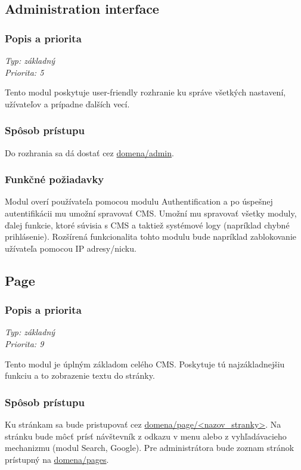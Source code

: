 \documentclass[a4paper,titlepage,11pt]{article}
\begin{document}
\subsection{Administration interface}
\subsubsection{Popis a priorita}
\begin{flushleft}
 \emph{Typ: základný}\\
 \emph{Priorita: 5}\\
\end{flushleft}
Tento modul poskytuje user-friendly rozhranie ku správe všetkých nastavení, užívateľov a prípadne ďalších vecí. 
\subsubsection{Spôsob prístupu}
Do rozhrania sa dá dostať cez \url{domena/admin}.
\subsubsection{Funkčné požiadavky}
Modul overí používateľa pomocou modulu Authentification a po úspešnej autentifikácii mu umožní spravovať CMS.
Umožní mu spravovať všetky moduly, ďalej funkcie, ktoré súvisia s CMS a taktiež systémové logy (napríklad chybné prihlásenie). Rozšírená funkcionalita tohto modulu bude napríklad zablokovanie užívateľa pomocou IP adresy\slash nicku.

\subsection{Page}
\subsubsection{Popis a priorita}
\begin{flushleft}
 \emph{Typ: základný}\\
 \emph{Priorita: 9}\\
\end{flushleft}
Tento modul je úplným základom celého CMS. Poskytuje tú najzákladnejšiu funkciu a to zobrazenie textu do stránky. 
\subsubsection{Spôsob prístupu}
Ku stránkam sa bude pristupovať cez \url{domena/page/<nazov_stranky>}.
Na stránku bude môcť prísť návštevník z odkazu v menu alebo z vyhľadávacieho mechanizmu (modul Search, Google). 
Pre administrátora bude zoznam stránok prístupný na \url{domena/pages}.
\end{document}
